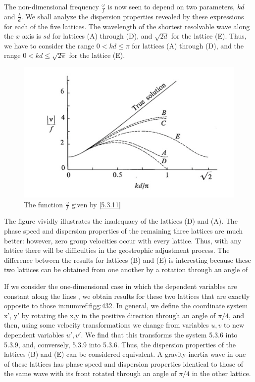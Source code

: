 The non-dimensional frequency $\frac{\omega}{f}$ is now seen to depend on two parameters, $kd$ and $\frac{\lambda}{d}$.
We shall analyze the dispersion properties revealed by these expressions for each of the five lattices. The wavelength of the shortest resolvable wave along the $x$ axis is $sd$ for lattices (A) through (D), and $\sqrt{2d}$ for the lattice (E). Thus, we have to consider the range $0<kd\leq\pi$ for lattices (A) through (D), and the range $0<kd\leq\sqrt{2\pi}$ for the lattice (E).
\begin{figure}[h]
	\centering
	\includegraphics[width=0.5\linewidth]{uploads/Screenshot 2024-11-14 124014.png}
	\caption{The function $\frac{\omega}{f}$ given by \ref{5.3.11}}
	\label{fig:5.3.2}
\end{figure}
The figure vividly illustrates the inadequacy of the lattices (D) and (A). The phase speed and dispersion properties of the remaining three lattices are much better: however, zero group velocities occur with every lattice. Thus, with any lattice there will be difficulties in the geostrophic adjustment process.
The difference between the results for lattices (B) and (E) is interesting because these two lattices can be obtained from one another by a rotation through an angle of

If we consider the one-dimensional case in which the dependent variables are constant along the lines
, we obtain results for these two lattices that are exactly opposite to those in:numref:figg:432. In general, we define the coordinate system x’, y’ by rotating the x,y in the positive direction through an angle of $\pi/4$, and then, using some velocity transformations we change from variables $u,v$ to new dependent variables $u',v'$. We find that this transforms the system 5.3.6 into 5.3.9, and, conversely, 5.3.9 into 5.3.6. Thus, the dispersion properties of the lattices (B) and (E) can be considered equivalent. A gravity-inertia wave in one of these lattices has phase speed and dispersion properties identical to those of the same wave with its front rotated through an angle of $\pi/4$ in the other lattice.

